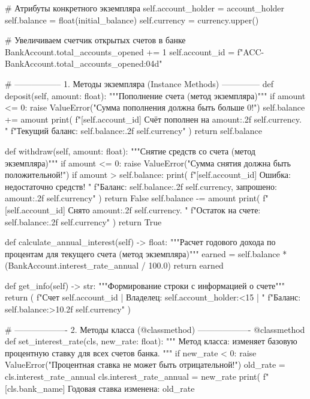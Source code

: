 \documentclass[14pt,a4paper]{extarticle}
\begin{document}
\begin{CodeListing}
        # Атрибуты конкретного экземпляра
        self.account_holder = account_holder
        self.balance = float(initial_balance)
        self.currency = currency.upper()

        # Увеличиваем счетчик открытых счетов в банке
        BankAccount.total_accounts_opened += 1
        self.account_id = f"ACC-{BankAccount.total_accounts_opened:04d}"

    # ----------------- 1. Методы экземпляра (Instance Methods) --------------
    def deposit(self, amount: float):
        """Пополнение счета (метод экземпляра)"""
        if amount <= 0:
            raise ValueError("Сумма пополнения должна быть больше 0!")
        self.balance += amount
        print(
            f"[{self.account_id}] Счёт пополнен на {amount:.2f} {self.currency}. "
            f"Текущий баланс: {self.balance:.2f} {self.currency}"
        )
        return self.balance

    def withdraw(self, amount: float):
        """Снятие средств со счета (метод экземпляра)"""
        if amount <= 0:
            raise ValueError("Сумма снятия должна быть положительной!")
        if amount > self.balance:
            print(
                f"[{self.account_id}] Ошибка: недостаточно средств! "
                f"Баланс: {self.balance:.2f} {self.currency}, запрошено: {amount:.2f} {self.currency}"
            )
            return False
        self.balance -= amount
        print(
            f"[{self.account_id}] Снято {amount:.2f} {self.currency}. "
            f"Остаток на счете: {self.balance:.2f} {self.currency}"
        )
        return True

    def calculate_annual_interest(self) -> float:
        """Расчет годового дохода по процентам для текущего счета (метод экземпляра)"""
        earned = self.balance * (BankAccount.interest_rate_annual / 100.0)
        return earned

    def get_info(self) -> str:
        """Формирование строки с информацией о счете"""
        return (
            f"Счет {self.account_id} | Владелец: {self.account_holder:<15} | "
            f"Баланс: {self.balance:>10.2f} {self.currency}"
        )

    # ------------------- 2. Методы класса (@classmethod) -------------------
    @classmethod
    def set_interest_rate(cls, new_rate: float):
        """
        Метод класса: изменяет базовую процентную ставку для всех счетов банка.
        """
        if new_rate < 0:
            raise ValueError("Процентная ставка не может быть отрицательной!")
        old_rate = cls.interest_rate_annual
        cls.interest_rate_annual = new_rate
        print(
            f"[{cls.bank_name}] Годовая ставка изменена: {old_rate}%


\end{CodeListing}
\end{document}
